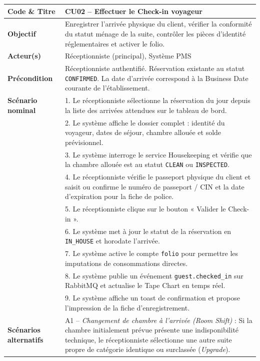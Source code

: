 \documentclass[12pt,a4paper,oneside]{report}
\begin{document}
\begin{table}[H]
\centering
\small
\renewcommand{\arraystretch}{1.2}
\begin{tabularx}{\textwidth}{|p{3.5cm}|X|}
\hline
\textbf{Code \& Titre} & \textbf{CU02 -- Effectuer le Check-in voyageur} \\
\hline
\textbf{Objectif} & Enregistrer l'arrivée physique du client, vérifier la conformité du statut ménage de la suite, contrôler les pièces d'identité réglementaires et activer le folio. \\
\hline
\textbf{Acteur(s)} & Réceptionniste (principal), Système PMS \\
\hline
\textbf{Précondition} & Réceptionniste authentifié. Réservation existante au statut \texttt{CONFIRMED}. La date d'arrivée correspond à la Business Date courante de l'établissement. \\
\hline
\textbf{Scénario nominal} & 
1. Le réceptionniste sélectionne la réservation du jour depuis la liste des arrivées attendues sur le tableau de bord.\\
& 2. Le système affiche le dossier complet : identité du voyageur, dates de séjour, chambre allouée et solde prévisionnel.\\
& 3. Le système interroge le service Housekeeping et vérifie que la chambre allouée est au statut \texttt{CLEAN} ou \texttt{INSPECTED}.\\
& 4. Le réceptionniste vérifie le passeport physique du client et saisit ou confirme le numéro de passeport / CIN et la date d'expiration pour la fiche de police.\\
& 5. Le réceptionniste clique sur le bouton « Valider le Check-in ».\\
& 6. Le système met à jour le statut de la réservation en \texttt{IN\_HOUSE} et horodate l'arrivée.\\
& 7. Le système active le compte \texttt{folio} pour permettre les imputations de consommations directes.\\
& 8. Le système publie un événement \texttt{guest.checked\_in} sur RabbitMQ et actualise le Tape Chart en temps réel.\\
& 9. Le système affiche un toast de confirmation et propose l'impression de la fiche d'enregistrement.\\
\hline
\textbf{Scénarios alternatifs} & 
A1 -- \textit{Changement de chambre à l'arrivée (Room Shift)} : Si la chambre initialement prévue présente une indisponibilité technique, le réceptionniste sélectionne une autre suite propre de catégorie identique ou surclassée (\textit{Upgrade}).\\

\end{tabularx}
\end{table}
\end{document}
